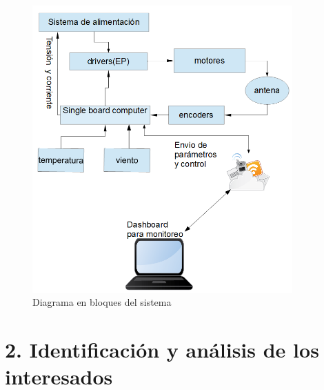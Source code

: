 \documentclass[11pt, %
codirector, %
]{charter}
\begin{document}
\begin{figure}[h!]
	\vspace{-0.1cm}
	\centering 
	\includegraphics[height=11cm,width =\textwidth]{Figuras/seccion_1/interferometria.png}
	\caption{Diagrama en bloques del sistema }
	\label{fig:bloques_sistema}
\end{figure} 



\section{2. Identificación y análisis de los interesados}
\label{sec:interesados}
\end{document}
